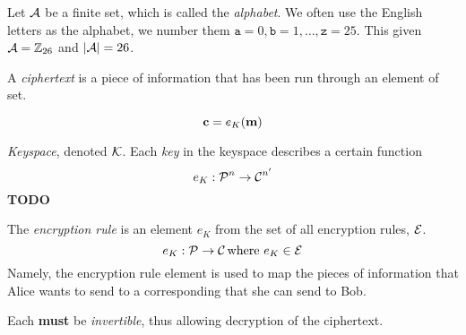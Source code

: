 \begin{definition}[Alphabet]\label{def:Alphabet}
  Let $\operatorname{\mathcal{A}}$ be a finite set, which is called the \emph{alphabet}.
  We often use the English letters as the alphabet, we number them $\mathtt{a} = 0, \mathtt{b} = 1, \ldots, \mathtt{z} = 25$.
  This given $\operatorname{\mathcal{A}} = \operatorname{\mathbb{Z}}_{26}$ and $\lvert \operatorname{\mathcal{A}} \rvert = 26$.
\end{definition}

\begin{definition}[Ciphertext]\label{def:Ciphertext}
  A \emph{ciphertext} is a piece of  information that has been run through an element of  set.

  \begin{equation}\label{eq:Ciphertext}
    \operatorname{\mathbf{c}} = e_{K} (\operatorname{\mathbf{m}})
  \end{equation}
\end{definition}

\begin{definition}[Keyspace]\label{def:Keyspace}
  \emph{Keyspace}, denoted $\operatorname{\mathcal{K}}$.
  Each \emph{key} in the keyspace describes a certain function
  \begin{equation}\label{eq:Keyspace}
    e_{K} : \operatorname{\mathcal{P}}^{n} \rightarrow \operatorname{\mathcal{C}}^{n'}
  \end{equation}
  \textbf{TODO}
\end{definition}

\begin{definition}\label{def:Encryption_Rule}
  The \emph{encryption rule} is an element $e_{K}$ from the set of all encryption rules, $\operatorname{\mathcal{E}}$.
  \begin{equation}\label{eq:Encryption_Rule}
    e_{K} : \operatorname{\mathcal{P}} \rightarrow \operatorname{\mathcal{C}} \text{where } e_{K} \in \operatorname{\mathcal{E}}
  \end{equation}
  Namely, the encryption rule element is used to map the  pieces of information that Alice wants to send to a corresponding  that she can send to Bob.

  \begin{remark}[Invertible]\label{rmk:Encryption_Rule_Invertible}
    Each  \textbf{must} be \emph{invertible}, thus allowing decryption of the ciphertext.
  \end{remark}
\end{definition}

